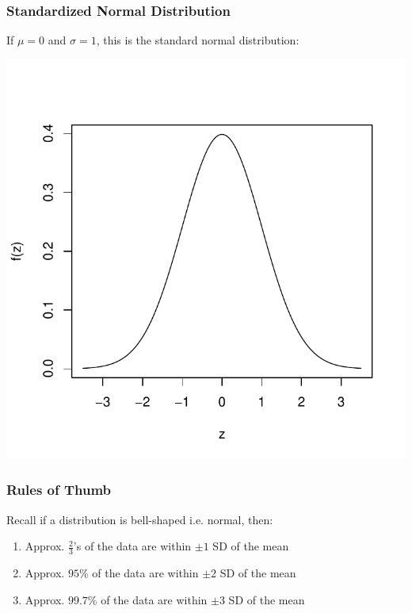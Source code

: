 \documentclass[handout]{beamer}
\newcommand{\blue}[1]{\textcolor{blue2}{#1}}
\begin{document}
\begin{frame}
\frametitle{Standardized Normal Distribution}
If $\mu=0$ and $\sigma=1$, this is the \blue{standard normal distribution}:
\begin{center}
\includegraphics{figure/standard_normal}
\end{center}
\end{frame}


\begin{frame}
\frametitle{Rules of Thumb}
Recall if a distribution is bell-shaped i.e. normal, then: \pause 
\begin{enumerate}
\item Approx. $\frac{2}{3}$'s of the data are within $\pm 1$ SD of the mean
\item Approx. $95\%$ of the data are within $\pm 2$ SD of the mean
\pause\item Approx. $99.7\%$ of the data are within $\pm 3$ SD of the mean
\end{enumerate}

\end{frame}
\end{document}

